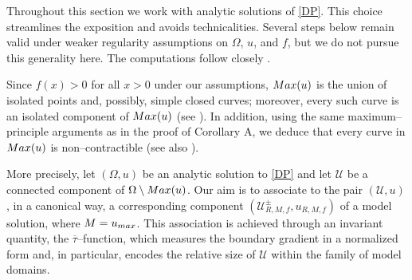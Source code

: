 \documentclass[11pt]{article}
\newcommand{\U}{\mathcal{U}}
\numberwithin{equation} {section}
\begin{document}
\begin{remark}\label{RemCond}
Throughout this section we work with analytic solutions of \eqref{DP}. This choice streamlines the exposition and avoids technicalities. Several steps below remain valid under weaker regularity assumptions on $\Omega$, $u$, and $f$, but we do not pursue this generality here. The computations follow closely \cite[Section~4.1]{EMa}.

Since $f(x)>0$ for all $x>0$ under our assumptions, $\textup{Max}(u)$ is the union of isolated points and, possibly, simple closed curves; moreover, every such curve is an isolated component of $\textup{Max}(u)$ (see \cite[Corollary~3.4]{Chr}). In addition, using the same maximum--principle arguments as in the proof of Corollary A, we deduce that every curve in $\textup{Max}(u)$ is non--contractible (see also \cite[Lemma 3.1]{EMa}).

\end{remark}


More precisely, let $(\Omega,u)$ be an analytic solution to \eqref{DP} and let $\U$ be a connected component of $\Omega\setminus \textup{Max}(u)$. Our aim is to associate to the pair $(\U,u)$, in a canonical way, a corresponding component $(\U_{R,M,f}^{\pm},u_{R,M,f})$ of a model solution, where $M=u_{\textup{max}}$. This association is achieved through an invariant quantity, the $\overline{\tau}$--function, which measures the boundary gradient in a normalized form and, in particular, encodes the relative size of $\U$ within the family of model domains.
\end{document}
